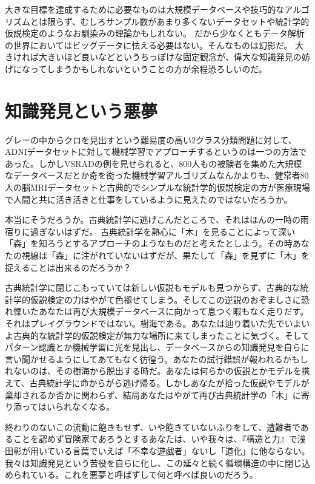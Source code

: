 大きな目標を達成するために必要なものは大規模データベースや技巧的なアルゴリズムとは限らず、むしろサンプル数があまり多くないデータセットや統計学的仮説検定のようなお馴染みの理論かもしれない。
だから少なくともデータ解析の世界においてはビッグデータに怯える必要はない。そんなものは幻影だ。
大きければ大きいほど良いなどというちっぽけな固定観念が、偉大な知識発見の妨げになってしまうかもしれないということの方が余程恐ろしいのだ。

\section{知識発見という悪夢}
グレーの中からクロを見出すという難易度の高い2クラス分類問題に対して、ADNIデータセットに対して機械学習でアプローチするというのは一つの方法であった。しかしVSRADの例を見せられると、800人もの被験者を集めた大規模なデータベースだとか奇を衒った機械学習アルゴリズムなんかよりも、健常者80人の脳MRIデータセットと古典的でシンプルな統計学的仮説検定の方が医療現場で人間と共に活き活きと仕事をしているように見えたのではないだろうか。

本当にそうだろうか。古典統計学に逃げこんだところで、それはほんの一時の雨宿りに過ぎないはずだ。
古典統計学を熱心に「木」を見ることによって深い「森」を知ろうとするアプローチのようなものだと考えたとしよう。その時あなたの視線は「森」に注がれていないはずだが、果たして「森」を見ずに「木」を捉えることは出来るのだろうか？

古典統計学に閉じこもっていては新しい仮説もモデルも見つからず、古典的な統計学的仮説検定の力はやがて色褪せてしまう。そしてこの逆説のおぞましさに恐れ慄いたあなたは再び大規模データベースに向かって息つく暇もなく走りだす。それはプレイグラウンドではない。樹海である。あなたは辿り着いた先でいよいよ古典的な統計学的仮説検定が無力な場所に来てしまったことに気づく。そしてパターン認識とか機械学習に光を見出し、データベースからの知識発見を自らに言い聞かせるようにしてあてもなく彷徨う。あなたの試行錯誤が報われるかもしれないのは、その樹海から脱出する時だ。あなたは何らかの仮説とかモデルを携えて、古典統計学に命からがら逃げ帰る。しかしあなたが拾った仮説やモデルが棄却されるか否かに関わらず、結局あなたはやがて再び古典統計学の「木」に寄り添ってはいられなくなる。

終わりのないこの流動に飽きもせず、いや飽きていないふりをして、遭難者であることを認めず冒険家であろうとするあなたは、いや我々は、『構造と力』で浅田彰が用いている言葉でいえば「不幸な遊戯者」ないし「道化」に他ならない。我々は知識発見という苦役を自らに化し、この延々と続く循環構造の中に閉じ込められている。これを悪夢と呼ばずして何と呼べば良いのだろう。

